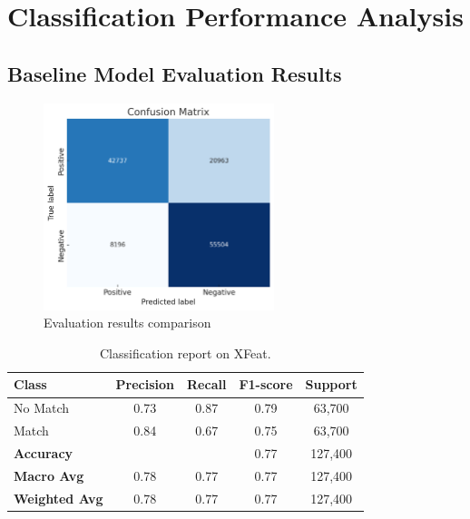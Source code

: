 \section{Classification Performance Analysis}

\subsection{Baseline Model Evaluation Results}

\begin{figure}[H]
    \centering
    \includegraphics[width=0.6\textwidth]{ressources/xfeat_cm.png}
    \caption{Evaluation results comparison}
    \label{fig:evaluation_results}
\end{figure}

\begin{table}[H]
    \centering
    \renewcommand{\arraystretch}{1.2}
    \begin{tabular}{lcccc}
        \toprule
        \textbf{Class}        & \textbf{Precision} & \textbf{Recall} & \textbf{F1-score} & \textbf{Support} \\
        \midrule
        No Match              & 0.73               & 0.87            & 0.79              & 63,700           \\
        Match                 & 0.84               & 0.67            & 0.75              & 63,700           \\
        \midrule
        \textbf{Accuracy}     &                    &                 & 0.77              & 127,400          \\
        \textbf{Macro Avg}    & 0.78               & 0.77            & 0.77              & 127,400          \\
        \textbf{Weighted Avg} & 0.78               & 0.77            & 0.77              & 127,400          \\
        \bottomrule
    \end{tabular}
    \caption{Classification report on XFeat.}
    \label{tab:classification_report}
\end{table}


